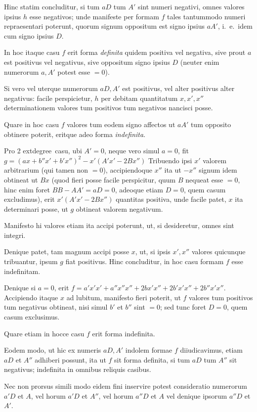 \documentclass[12pt,a4paper]{article}
\theoremstyle{plain}
\theoremstyle{definition}
\theoremstyle{remark}
\begin{document}
Hinc statim concluditur, si tum $aD$ tum $A'$ sint numeri negativi, omnes valores ipsius $h$ esse negativos; unde manifeste per formam $f$ tales tantummodo numeri repraesentari poterunt, quorum signum oppositum est signo ipsius $aA'$, i.\ e.\ idem cum signo ipsius $D$.

In hoc itaque casu $f$ erit forma \emph{definita} quidem positiva vel negativa, sive prout $a$ est positivus vel negativus, sive oppositum signo ipsius $D$ (neuter enim numerorum $a, A'$ potest esse $= 0$).

Si vero vel uterque numerorum $aD, A'$ est positivus, vel alter positivus alter negativus: facile perspicietur, $h$ per debitam quantitatum $x, x', x''$ determinationem valores tum positivos tum negativos nancisci posse.

Quare in hoc casu $f$ valores tum eodem signo affectos ut $aA'$ tum opposito obtinere poterit, eritque adeo forma \emph{indefinita}.

Pro 2	extdegree\ casu, ubi $A' = 0$, neque vero simul $a = 0$, fit
$g = (ax+b''x'+b'x'')^2 - x'(A'x' - 2Bx'')$
Tribuendo ipsi $x'$ valorem arbitrarium (qui tamen non $= 0$), accipiendoque $x''$ ita ut $-x''$ signum idem obtineat ut $Bx$ (quod fieri posse facile perspicitur, quum $B$ nequeat esse $= 0$, hinc enim foret $BB - AA' = aD = 0$, adeoque etiam $D = 0$, quem casum excludimus), erit $x'(A'x' - 2Bx'')$ quantitas positiva, unde facile patet, $x$ ita determinari posse, ut $g$ obtineat valorem negativum.

Manifesto hi valores etiam ita accipi poterunt, ut, si desideretur, omnes sint integri.

Denique patet, tam magnum accipi posse $x$, ut, si ipsis $x', x''$ valores quicunque tribuantur, ipsum $g$ fiat positivus. Hinc concluditur, in hoc casu formam $f$ esse indefinitam.

Denique si $a = 0$, erit $f = a'x'x' + a''x''x'' + 2bx'x'' + 2b'x'x'' + 2b''x'x''$. Accipiendo itaque $x$ ad lubitum, manifesto fieri poterit, ut $f$ valores tum positivos tum negativus obtineat, nisi simul $b'$ et $b''$ sint $= 0$; sed tunc foret $D = 0$, quem casum exclusimus.

Quare etiam in hocce casu $f$ erit forma indefinita.

Eodem modo, ut hic ex numeris $aD, A'$ indolem formae $f$ diiudicavimus, etiam $aD$ et $A''$ adhiberi possunt, ita ut $f$ sit forma definita, si tum $aD$ tum $A''$ sit negativus; indefinita in omnibus reliquis casibus.

Nec non prorsus simili modo eidem fini inservire potest consideratio numerorum $a'D$ et $A$, vel horum $a'D$ et $A''$, vel horum $a''D$ et $A$ vel denique ipsorum $a''D$ et $A'$.
\end{document}
